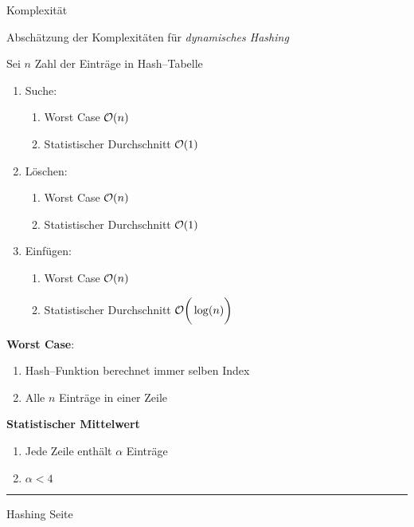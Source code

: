 \begin{slide}{}
\normalsize

\begin{center}
Komplexit\"at 
\end{center}
\vspace*{0.5cm}

\footnotesize
Absch\"atzung der Komplexit\"aten f\"ur \emph{dynamisches Hashing}

Sei $n$ Zahl der Eintr\"age in Hash--Tabelle
\begin{enumerate}
\item Suche:    
  \begin{enumerate}
  \item Worst Case                 \hspace*{7.2cm} $\mathcal{O}(n)$
  \item Statistischer Durchschnitt \hspace*{2.9cm} $\mathcal{O}(1)$ 
  \end{enumerate}
\item L\"oschen: 
  \begin{enumerate}
  \item Worst Case                 \hspace*{7.2cm} $\mathcal{O}(n)$
  \item Statistischer Durchschnitt \hspace*{2.9cm} $\mathcal{O}(1)$ 
  \end{enumerate}
\item Einf\"ugen: \hspace*{1.3cm}   
  \begin{enumerate}
  \item Worst Case                 \hspace*{7.2cm} $\mathcal{O}(n)$
  \item Statistischer Durchschnitt \hspace*{1.5cm} $\mathcal{O}\bigg(\log(n)\bigg)$ 
  \end{enumerate}
\end{enumerate}
\textbf{Worst Case}: 
\begin{enumerate}
\item Hash--Funktion berechnet immer selben Index
\item Alle $n$ Eintr\"age in einer Zeile
\end{enumerate}
\textbf{Statistischer Mittelwert}
\begin{enumerate}
\item Jede Zeile enth\"alt $\alpha$ Eintr\"age
\item $\alpha < 4$
\end{enumerate}

\vspace*{\fill}
\tiny \addtocounter{mypage}{1}
\rule{17cm}{1mm}
Hashing  \hspace*{\fill} Seite 
\end{slide}

